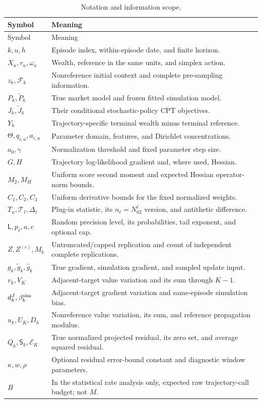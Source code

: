 \documentclass[11pt]{article}
\newcommand{\1}{\mathbf 1}
\newcommand{\cF}{\mathcal F}
\newcommand{\Sta}{\mathsf S}
\theoremstyle{definition}
\begin{document}
\begin{longtable}{@{}p{}p{}@{}}
\caption{Notation and information scope.}\label{tab:notation}\\
\toprule Symbol & Meaning \\\midrule\endfirsthead
\toprule Symbol & Meaning \\\midrule\endhead
$k,u,h$ & Episode index, within-episode date, and finite horizon.\\
$X_u,r_u,\omega_u$ & Wealth, reference in the same units, and simplex action.\\
$z_k,\cF_k$ & Nonreference initial context and complete pre-sampling information.\\
$P_k,\widetilde P_k$ & True market model and frozen fitted simulation model.\\
$J_k,\widetilde J_k$ & Their conditional stochastic-policy CPT objectives.\\
$Y_k$ & Trajectory-specific terminal wealth minus terminal reference.\\
$\Theta,q_{i,u},a_{i,u}$ & Parameter domain, features, and Dirichlet concentrations.\\
$a_0,\gamma$ & Normalization threshold and fixed parameter step size.\\
$G,H$ & Trajectory log-likelihood gradient and, where used, Hessian.\\
$M_2,M_H$ & Uniform score second moment and expected Hessian operator-norm bounds.\\
$C_1,C_2,C_3$ & Uniform derivative bounds for the fixed normalized weights.\\
$T_n,\mathcal T_\ell,\Delta_\ell$ & Plug-in statistic, its $n_\ell=N_02^\ell$ version, and antithetic difference.\\
$\mathsf L,p_\ell,a,c$ & Random precision level, its probabilities, tail exponent, and optional cap.\\
$Z,Z^{(c)},M_k$ & Untruncated/capped replication and count of independent complete replications.\\
$g_k,\widetilde g_k,\widehat g_k$ & True gradient, simulation gradient, and sampled update input.\\
$v_k,V_K$ & Adjacent-target value variation and its sum through $K-1$.\\
$d_k^J,\beta_k^{\rm sim}$ & Adjacent-target gradient variation and same-episode simulation bias.\\
$u_k,U_K,D_h$ & Nonreference value variation, its sum, and reference propagation modulus.\\
$Q_k,\Sta_k,\mathcal E_K$ & True normalized projected residual, its zero set, and average squared residual.\\
$\kappa,w,\rho$ & Optional residual error-bound constant and diagnostic window parameters.\\
$B$ & In the statistical rate analysis only, expected raw trajectory-call budget; not $M$.\\
\bottomrule
\end{longtable}
\end{document}
